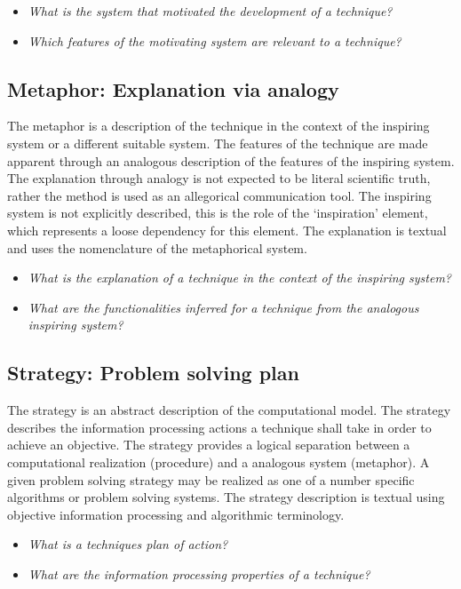 \documentclass[a4paper, 11pt]{article}
\begin{document}
\begin{itemize}
	\item \emph{What is the system that motivated the development of a technique?}
	\item \emph{Which features of the motivating system are relevant to a technique?}
\end{itemize}

\subsection{Metaphor: Explanation via analogy}
The metaphor is a description of the technique in the context of the inspiring system or a different suitable system. The features of the technique are made apparent through an analogous description of the features of the inspiring system. The explanation through analogy is not expected to be literal scientific truth, rather the method is used as an allegorical communication tool. The inspiring system is not explicitly described, this is the role of the `inspiration' element, which represents a loose dependency for this element. The explanation is textual and uses the nomenclature of the metaphorical system. 

\begin{itemize}
	\item \emph{What is the explanation of a technique in the context of the inspiring system?}
	\item \emph{What are the functionalities inferred for a technique from the analogous inspiring system?}
\end{itemize}

\subsection{Strategy: Problem solving plan}
The strategy is an abstract description of the computational model. The strategy describes the information processing actions a technique shall take in order to achieve an objective. The strategy provides a logical separation between a computational realization (procedure) and a analogous system (metaphor). A given problem solving strategy may be realized as one of a number specific algorithms or problem solving systems. The strategy description is textual using objective information processing and algorithmic terminology.

\begin{itemize}
	\item \emph{What is a techniques plan of action?}
	\item \emph{What are the information processing properties of a technique?}
\end{itemize}
\end{document}
